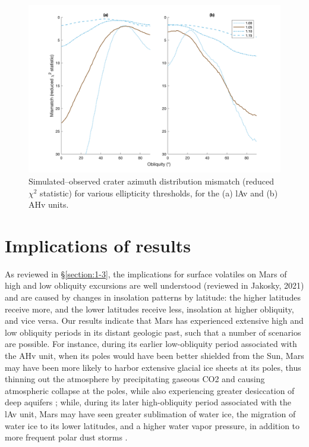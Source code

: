 \documentclass{ucetd}
\begin{document}
\begin{figure}
    \includegraphics[width=\textwidth]{figures/fig4_3.png}
    \caption[Simulated--observed crater azimuth distribution mismatch by ellipticity threshold]{Simulated--observed crater azimuth distribution mismatch (reduced $\chi^2$ statistic) for various ellipticity thresholds, for the (a) lAv and (b) AHv units.}
    \label{fig:4-3}
\end{figure}

\section{Implications of results}
\label{section:4-4}

As reviewed in §\ref{section:1-3}, the implications for surface volatiles on Mars of high and low obliquity excursions are well understood (reviewed in Jakosky, 2021) and are caused by changes in insolation patterns by latitude: the higher latitudes receive more, and the lower latitudes receive less, insolation at higher obliquity, and vice versa. Our results indicate that Mars has experienced extensive high and low obliquity periods in its distant geologic past, such that a number of scenarios are possible. For instance, during its earlier low-obliquity period associated with the AHv unit, when its poles would have been better shielded from the Sun, Mars may have been more likely to harbor extensive glacial ice sheets at its poles, thus thinning out the atmosphere by precipitating gaseous CO2 and causing atmospheric collapse at the poles, while also experiencing greater desiccation of deep aquifers \citep{lindner1985a, kreslavsky2005a, phillips2011a, soto2015a, grimm2017a}; while, during its later high-obliquity period associated with the lAv unit, Mars may have seen greater sublimation of water ice, the migration of water ice to its lower latitudes, and a higher water vapor pressure, in addition to more frequent polar dust storms \citep{haberle1990a, jakosky1995a, zent2013a, forget2017a}.
\end{document}
